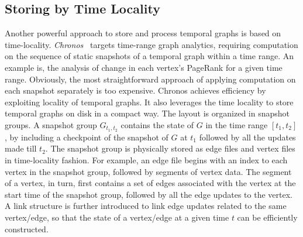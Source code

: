 \documentclass{svjour3}
\begin{document}
\subsection{Storing by Time Locality}
Another powerful approach to store and process temporal graphs is based on time-locality. {\em Chronos}~\cite{han2014chronos} targets time-range graph analytics, requiring computation on the sequence of static snapshots of a temporal graph within a time range. An example is, the analysis of change in each vertex's PageRank for a given time range. Obviously, the most straightforward approach of applying computation on each snapshot separately is too expensive. Chronos achieves efficiency by exploiting locality of temporal graphs.
It also leverages the time locality to store temporal graphs on disk in a compact way. The layout is organized in snapshot groups. A snapshot group $G_{t_1,t_2}$ contains the state of $G$ in the time range $[t_1,t_2]$, by including a checkpoint of the snapshot of $G$ at $t_1$ followed by all the updates made till $t_2$. The snapshot group is physically stored as edge files and vertex files in time-locality fashion. For example, an edge file begins with an index to each vertex in the snapshot group, followed by segments of vertex data. The segment of a vertex, in turn, first contains a set of edges associated with the vertex at the start time of the snapshot group, followed by all the edge updates to the vertex. A link structure is further introduced to link edge updates related to the same vertex/edge, so that the state of a vertex/edge at a given time $t$ can be efficiently constructed. %
\end{document}
